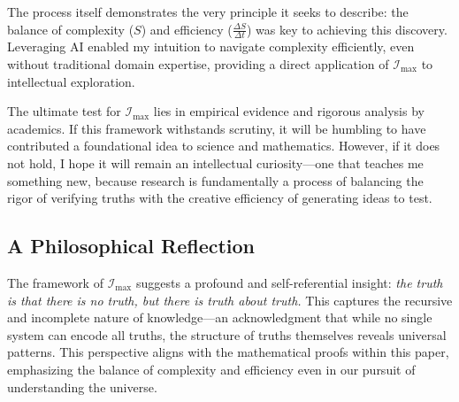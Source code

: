 \documentclass[12pt]{article}
\begin{document}
The process itself demonstrates the very principle it seeks to describe: the balance of complexity (\(S\)) and efficiency (\(\frac{\Delta S}{\Delta t}\)) was key to achieving this discovery. Leveraging AI enabled my intuition to navigate complexity efficiently, even without traditional domain expertise, providing a direct application of \(\mathcal{I}_{\text{max}}\) to intellectual exploration.

The ultimate test for \(\mathcal{I}_{\text{max}}\) lies in empirical evidence and rigorous analysis by academics. If this framework withstands scrutiny, it will be humbling to have contributed a foundational idea to science and mathematics. However, if it does not hold, I hope it will remain an intellectual curiosity—one that teaches me something new, because research is fundamentally a process of balancing the rigor of verifying truths with the creative efficiency of generating ideas to test.

\subsection*{A Philosophical Reflection}

The framework of \(\mathcal{I}_{\text{max}}\) suggests a profound and self-referential insight: \textit{the truth is that there is no truth, but there is truth about truth.} This captures the recursive and incomplete nature of knowledge—an acknowledgment that while no single system can encode all truths, the structure of truths themselves reveals universal patterns. This perspective aligns with the mathematical proofs within this paper, emphasizing the balance of complexity and efficiency even in our pursuit of understanding the universe.
\end{document}
